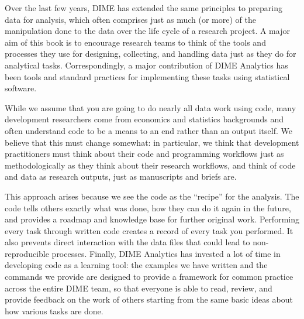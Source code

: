 Over the last few years, DIME has extended the same principles to preparing data for analysis,
which often comprises just as much (or more) of the manipulation done to the data
over the life cycle of a research project.
A major aim of this book is to encourage research teams
to think of the tools and processes they use
for designing, collecting, and handling data
just as they do for analytical tasks.
Correspondingly, a major contribution of DIME Analytics
has been tools and standard practices
for implementing these tasks using statistical software.

While we assume that you are going to do nearly all data work using code,
many development researchers come from economics and statistics backgrounds
and often understand code to be a means to an end rather than an output itself.
We believe that this must change somewhat:
in particular, we think that development practitioners
must think about their code and programming workflows
just as methodologically as they think about their research workflows,
and think of code and data as research outputs, just as manuscripts and briefs are.

This approach arises because we see the code as the ``recipe'' for the analysis.
The code tells others exactly what was done,
how they can do it again in the future,
and provides a roadmap and knowledge base for further original work.
Performing every task through written code
creates a record of every task you performed.
It also prevents direct interaction
with the data files that could lead to non-reproducible processes.
Finally, DIME Analytics has invested a lot of time in developing code as a learning tool:
the examples we have written and the commands we provide
are designed to provide a framework for common practice
across the entire DIME team, so that everyone is able to
read, review, and provide feedback on the work of others
starting from the same basic ideas about how various tasks are done.

